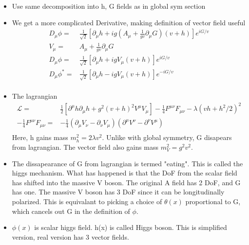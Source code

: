 \begin{itemize}
\begin{itemize}
        \item Use same decomposition into h, G fields as in global sym section \cite{wells}
        \item We get a more complicated Derivative, making definition of vector field useful \cite{wells}
        \begin{equation}\begin{split}
        D_\mu\phi=&\frac{1}{\sqrt{2}}\left[\partial_\mu h+ig(A_\mu+\frac{1}{gv}\partial_\mu G)(v+h)\right] e^{iG/v} \\
        V_\mu=&A_\mu+\frac{1}{gv}\partial_\mu G \\
        D_\mu\phi=&\frac{1}{\sqrt{2}}\left[\partial_\mu h+igV_\mu(v+h)\right] e^{iG/v} \\
        D_\mu\phi^*=&\frac{1}{\sqrt{2}}\left[\partial_\mu h-igV_\mu(v+h)\right] e^{-iG/v} \\
        \end{split}\end{equation}
        \item The lagrangian \cite{wells}
        \begin{equation}\begin{split}
        \mathcal{L}=&\frac{1}{2}[\partial^\mu h\partial_\mu h+g^2(v+h)^2V^\mu V_\mu]-\frac{1}{4}F^{\mu\nu}F_{\mu\nu}-\lambda(vh+h^2/2)^2 \\
        -\frac{1}{4}F^{\mu\nu}F_{\mu\nu}=&-\frac{1}{4}(\partial_\mu V_\nu-\partial_\nu V_\mu)(\partial^\mu V^\nu-\partial^\nu V^\mu) \\
        \end{split}\end{equation}
        Here, h gains mass $m_h^2=2\lambda v^2$. Unlike with global symmetry, G disapears from lagrangian. The vector field also gains mass $m_V^2=g^2v^2$.
        \item The dissapearance of G from lagrangian is termed {\color{blue}"eating"}. This is called the higgs mechanism. What has happened is that the DoF from the scalar field has shifted into the massive V boson. The original A field has 2 DoF, and G has one. The massive V boson has 3 DoF since it can be longitudinally polarized. This is equivalant to picking a choice of $\theta(x)$ proportional to G, which cancels out G in the definition of $\phi$. \cite{wells}
        \item $\phi(x)$ is scalar higgs field. h(x) is called Higgs boson. {\color{red} This is simplified version, real version has 3 vector fields.} \cite{wells}
    \end{itemize}

\end{itemize}
